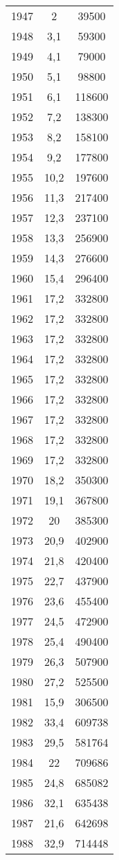 \documentclass[french,11pt]{book}
\begin{document}
\begin{longtable}[t]{ccc}
1947 & 2 & 39500\\
1948 & 3,1 & 59300\\
1949 & 4,1 & 79000\\
1950 & 5,1 & 98800\\
1951 & 6,1 & 118600\\
1952 & 7,2 & 138300\\
1953 & 8,2 & 158100\\
1954 & 9,2 & 177800\\
1955 & 10,2 & 197600\\
1956 & 11,3 & 217400\\
1957 & 12,3 & 237100\\
1958 & 13,3 & 256900\\
1959 & 14,3 & 276600\\
1960 & 15,4 & 296400\\
1961 & 17,2 & 332800\\
1962 & 17,2 & 332800\\
1963 & 17,2 & 332800\\
1964 & 17,2 & 332800\\
1965 & 17,2 & 332800\\
1966 & 17,2 & 332800\\
1967 & 17,2 & 332800\\
1968 & 17,2 & 332800\\
1969 & 17,2 & 332800\\
1970 & 18,2 & 350300\\
1971 & 19,1 & 367800\\
1972 & 20 & 385300\\
1973 & 20,9 & 402900\\
1974 & 21,8 & 420400\\
1975 & 22,7 & 437900\\
1976 & 23,6 & 455400\\
1977 & 24,5 & 472900\\
1978 & 25,4 & 490400\\
1979 & 26,3 & 507900\\
1980 & 27,2 & 525500\\
1981 & 15,9 & 306500\\
1982 & 33,4 & 609738\\
1983 & 29,5 & 581764\\
1984 & 22 & 709686\\
1985 & 24,8 & 685082\\
1986 & 32,1 & 635438\\
1987 & 21,6 & 642698\\
1988 & 32,9 & 714448\\

\end{longtable}
\end{document}
